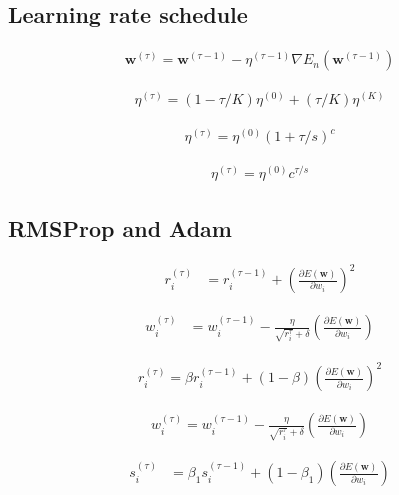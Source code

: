 \documentclass{article}
\begin{document}
\subsection{Learning rate schedule}

\begin{align*}
\mathbf{w}^{(\tau)}=\mathbf{w}^{(\tau-1)}-\eta^{(\tau-1)} \nabla E_{n}\left(\mathbf{w}^{(\tau-1)}\right)
\tag{7.35}
\end{align*}

\begin{align*}
\eta^{(\tau)}=(1-\tau / K) \eta^{(0)}+(\tau / K) \eta^{(K)}  
\tag{7.36}
\end{align*}

\begin{align*}
\eta^{(\tau)}=\eta^{(0)}(1+\tau / s)^{c}  
\tag{7.37}
\end{align*}

\begin{align*}
\eta^{(\tau)}=\eta^{(0)} c^{\tau / s}
\tag{7.38}
\end{align*}

\subsection{RMSProp and Adam}

\begin{align*}
r_{i}^{(\tau)} & =r_{i}^{(\tau-1)}+\left(\frac{\partial E(\mathbf{w})}{\partial w_{i}}\right)^{2}  
\tag{7.39}
\end{align*}

\begin{align*}
w_{i}^{(\tau)} & =w_{i}^{(\tau-1)}-\frac{\eta}{\sqrt{r_{i}^{\tau}}+\delta}\left(\frac{\partial E(\mathbf{w})}{\partial w_{i}}\right)
\tag{7.40}
\end{align*}

\begin{align*}
r_{i}^{(\tau)}=\beta r_{i}^{(\tau-1)}+(1-\beta)\left(\frac{\partial E(\mathbf{w})}{\partial w_{i}}\right)^{2}  
\tag{7.41}
\end{align*}

\begin{align*}
w_{i}^{(\tau)}=w_{i}^{(\tau-1)}-\frac{\eta}{\sqrt{r_{i}^{\tau}}+\delta}\left(\frac{\partial E(\mathbf{w})}{\partial w_{i}}\right)
\tag{7.42}
\end{align*}

\begin{align*}
s_{i}^{(\tau)} & =\beta_{1} s_{i}^{(\tau-1)}+\left(1-\beta_{1}\right)\left(\frac{\partial E(\mathbf{w})}{\partial w_{i}}\right)  
\tag{7.43}
\end{align*}
\end{document}

